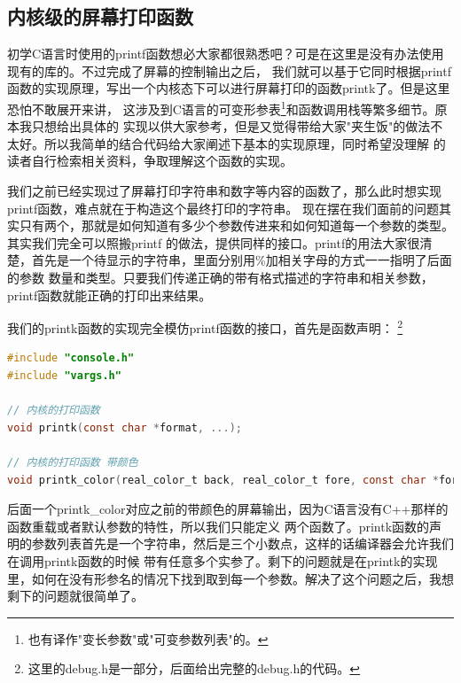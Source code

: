 \subsection {内核级的屏幕打印函数}

\par 初学C语言时使用的printf函数想必大家都很熟悉吧？可是在这里是没有办法使用现有的库的。不过完成了屏幕的控制输出之后，\allowbreak
我们就可以基于它同时根据printf函数的实现原理，写出一个内核态下可以进行屏幕打印的函数printk了。但是这里恐怕不敢展开来讲，\allowbreak
这涉及到C语言的可变形参表\footnote{也有译作"变长参数"或"可变参数列表"的。}和函数调用栈等繁多细节。原本我只想给出具体的\allowbreak
实现以供大家参考，但是又觉得带给大家"夹生饭"的做法不太好。所以我简单的结合代码给大家阐述下基本的实现原理，同时希望没理解\allowbreak
的读者自行检索相关资料，争取理解这个函数的实现。

\par 我们之前已经实现过了屏幕打印字符串和数字等内容的函数了，那么此时想实现printf函数，难点就在于构造这个最终打印的字符串。\allowbreak
现在摆在我们面前的问题其实只有两个，那就是如何知道有多少个参数传进来和如何知道每一个参数的类型。其实我们完全可以照搬printf\allowbreak
的做法，提供同样的接口。printf的用法大家很清楚，首先是一个待显示的字符串，里面分别用\%加相关字母的方式一一指明了后面的参数\allowbreak
数量和类型。只要我们传递正确的带有格式描述的字符串和相关参数，printf函数就能正确的打印出来结果。

\par 我们的printk函数的实现完全模仿printf函数的接口，首先是函数声明：\allowbreak
\footnote{这里的debug.h是一部分，后面给出完整的debug.h的代码。}

\begin{lstlisting}[language = C, caption = include/debug.h]
#include "console.h"
#include "vargs.h"

// 内核的打印函数
void printk(const char *format, ...);

// 内核的打印函数 带颜色
void printk_color(real_color_t back, real_color_t fore, const char *format, ...);
\end{lstlisting}

\par 后面一个printk\_color对应之前的带颜色的屏幕输出，因为C语言没有C++那样的函数重载或者默认参数的特性，所以我们只能定义\allowbreak
两个函数了。printk函数的声明的参数列表首先是一个字符串，然后是三个小数点，这样的话编译器会允许我们在调用printk函数的时候\allowbreak
带有任意多个实参了。剩下的问题就是在printk的实现里，如何在没有形参名的情况下找到取到每一个参数。解决了这个问题之后，我想\allowbreak
剩下的问题就很简单了。

